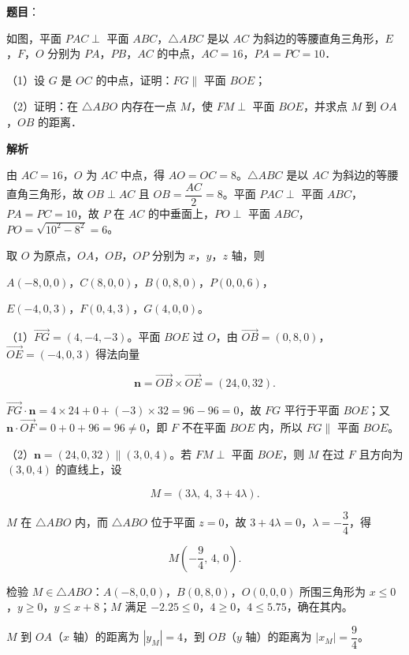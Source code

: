 \begin{answer}

\textbf{题目}：

如图，平面 $PAC\perp$ 平面 $ABC$，$\triangle ABC$ 是以 $AC$ 为斜边的等腰直角三角形，$E$，$F$，$O$ 分别为 $PA$，$PB$，$AC$ 的中点，$AC=16$，$PA=PC=10$．

（1）设 $G$ 是 $OC$ 的中点，证明：$FG\parallel$ 平面 $BOE$；

（2）证明：在 $\triangle ABO$ 内存在一点 $M$，使 $FM\perp$ 平面 $BOE$，并求点 $M$ 到 $OA$，$OB$ 的距离．
\nopagebreak[4]
\begin{center}\end{center}
\nopagebreak[4]
\textbf{解析}

由 $AC=16$，$O$ 为 $AC$ 中点，得 $AO=OC=8$。$\triangle ABC$ 是以 $AC$ 为斜边的等腰直角三角形，故 $OB\perp AC$ 且 $OB=\dfrac{AC}{2}=8$。平面 $PAC\perp$ 平面 $ABC$，$PA=PC=10$，故 $P$ 在 $AC$ 的中垂面上，$PO\perp$ 平面 $ABC$，$PO=\sqrt{10^2-8^2}=6$。

取 $O$ 为原点，$OA$，$OB$，$OP$ 分别为 $x$，$y$，$z$ 轴，则

$A(-8,0,0)$，$C(8,0,0)$，$B(0,8,0)$，$P(0,0,6)$，

$E(-4,0,3)$，$F(0,4,3)$，$G(4,0,0)$。

（1）$\overrightarrow{FG}=(4,-4,-3)$。平面 $BOE$ 过 $O$，由 $\overrightarrow{OB}=(0,8,0)$，$\overrightarrow{OE}=(-4,0,3)$ 得法向量

\nopagebreak[4]
\[\boldsymbol n=\overrightarrow{OB}\times\overrightarrow{OE}=(24,0,32).\]

$\overrightarrow{FG}\cdot\boldsymbol n=4\times24+0+(-3)\times32=96-96=0$，故 $FG$ 平行于平面 $BOE$；又 $\boldsymbol n\cdot\overrightarrow{OF}=0+0+96=96\neq0$，即 $F$ 不在平面 $BOE$ 内，所以 $FG\parallel$ 平面 $BOE$。

（2）$\boldsymbol n=(24,0,32)\parallel(3,0,4)$。若 $FM\perp$ 平面 $BOE$，则 $M$ 在过 $F$ 且方向为 $(3,0,4)$ 的直线上，设

\nopagebreak[4]
\[M=(3\lambda,\,4,\,3+4\lambda).\]

$M$ 在 $\triangle ABO$ 内，而 $\triangle ABO$ 位于平面 $z=0$，故 $3+4\lambda=0$，$\lambda=-\dfrac34$，得

\nopagebreak[4]
\[M\left(-\frac94,\,4,\,0\right).\]

检验 $M\in\triangle ABO$：$A(-8,0,0)$，$B(0,8,0)$，$O(0,0,0)$ 所围三角形为 $x\leqslant0$，$y\geqslant0$，$y\leqslant x+8$；$M$ 满足 $-2.25\leqslant0$，$4\geqslant0$，$4\leqslant5.75$，确在其内。

$M$ 到 $OA$（$x$ 轴）的距离为 $|y_M|=4$，到 $OB$（$y$ 轴）的距离为 $|x_M|=\dfrac94$。


\end{answer}
